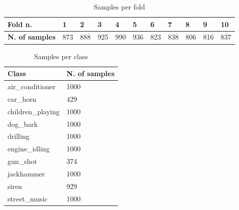 \documentclass{article}
\begin{document}
\begin{table}[ht]
\centering
\begin{tabular}{|l|l|l|l|l|l|l|l|l|l|l|}
\hline
\textbf{Fold n.}          & 1   & 2   & 3   & 4   & 5   & 6   & 7   & 8   & 9   & 10  \\ \hline
\textbf{N. of samples} & 873 & 888 & 925 & 990 & 936 & 823 & 838 & 806 & 816 & 837 \\ \hline
\end{tabular}
\caption{Samples per fold}
\label{tab::samples_per_fold}
\end{table}



\begin{table}[ht]
\centering
\begin{tabular}{|l|l|}
\hline
\textbf{Class}    & \textbf{N. of samples} \\ \hline
air\_conditioner  & 1000                   \\ \hline
car\_horn         & 429                    \\ \hline
children\_playing & 1000                   \\ \hline
dog\_bark         & 1000                   \\ \hline
drilling          & 1000                   \\ \hline
engine\_idling    & 1000                   \\ \hline
gun\_shot         & 374                    \\ \hline
jackhammer        & 1000                   \\ \hline
siren             & 929                    \\ \hline
street\_music     & 1000                   \\ \hline
\end{tabular}
\caption{Samples per class}
\label{tab::samples_per_class}
\end{table}
\end{document}
